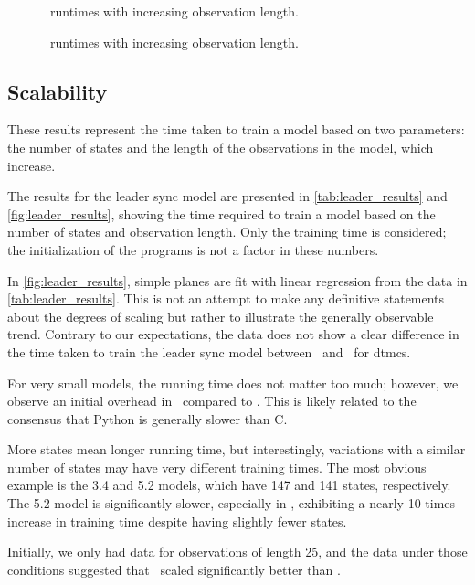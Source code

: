 \begin{figure}
    
    \caption{\Cupaal\ runtimes with increasing observation length.}
    \label{fig:cupaal-length-to-runtime}
\end{figure}


\begin{figure}
    
    \caption{\Jajapy\ runtimes with increasing observation length.}
    \label{fig:jajapy-length-to-runtime}
\end{figure}


\subsection{Scalability}\label{subsec:scalability}
These results represent the time taken to train a model based on two parameters: the number of states and the length of the observations in the model, which increase.

The results for the leader sync model are presented in \autoref{tab:leader_results} and \autoref{fig:leader_results}, showing the time required to train a model based on the number of states and observation length. Only the training time is considered; the initialization of the programs is not a factor in these numbers.

In \autoref{fig:leader_results}, simple planes are fit with linear regression from the data in \autoref{tab:leader_results}.
This is not an attempt to make any definitive statements about the degrees of scaling but rather to illustrate the generally observable trend.
Contrary to our expectations, the data does not show a clear difference in the time taken to train the leader sync model between \Jajapy\ and \Cupaal\ for \glspl{dtmc}.

For very small models, the running time does not matter too much; however, we observe an initial overhead in \Jajapy\ compared to \Cupaal. This is likely related to the consensus that Python is generally slower than C.

More states mean longer running time, but interestingly, variations with a similar number of states may have very different training times.
The most obvious example is the 3.4 and 5.2 models, which have 147 and 141 states, respectively.
The 5.2 model is significantly slower, especially in \Cupaal, exhibiting a nearly 10 times increase in training time despite having slightly fewer states.

Initially, we only had data for observations of length 25, and the data under those conditions suggested that \Jajapy\ scaled significantly better than \Cupaal.


